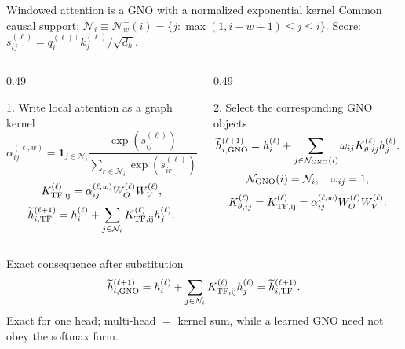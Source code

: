 \begin{frame}[t,shrink=5]{Windowed attention is a GNO with a normalized exponential kernel}
Common causal support: $\mathcal N_i\equiv\mathcal N_w^{-}(i)=\{j:\max(1,i-w+1)\le j\le i\}$. Score: $s_{ij}^{(\ell)}=q_i^{(\ell)\top}k_j^{(\ell)}/\sqrt{d_k}$.\begin{columns}[T,onlytextwidth]
\begin{column}{0.49\textwidth}
\begin{block}{1. Write local attention as a graph kernel}
\[\alpha_{ij}^{(\ell,w)}=\mathbf1_{j\in\mathcal N_i}\frac{\exp(s_{ij}^{(\ell)})}{\sum_{r\in\mathcal N_i}\exp(s_{ir}^{(\ell)})}.\]
\[K_{\rm TF,ij}^{(\ell)}=\alpha_{ij}^{(\ell,w)}W_O^{(\ell)}W_V^{(\ell)},\]
\[\widetilde h_{i,\rm TF}^{(\ell+1)}=h_i^{(\ell)}+\sum_{j\in\mathcal N_i}K_{\rm TF,ij}^{(\ell)}h_j^{(\ell)}.\]
\end{block}

\end{column}
\begin{column}{0.49\textwidth}
\begin{block}{2. Select the corresponding GNO objects}
\[\widetilde h_{i,\rm GNO}^{(\ell+1)}=h_i^{(\ell)}+\sum_{j\in\mathcal N_{\rm GNO}(i)}\omega_{ij}K_{\theta,ij}^{(\ell)}h_j^{(\ell)}.\]
\[\mathcal N_{\rm GNO}(i)=\mathcal N_i,\quad\omega_{ij}=1,\]
\[K_{\theta,ij}^{(\ell)}=K_{\rm TF,ij}^{(\ell)}=\alpha_{ij}^{(\ell,w)}W_O^{(\ell)}W_V^{(\ell)}.\]
\end{block}

\end{column}
\end{columns}
\begin{alertblock}{Exact consequence after substitution}
\[\widetilde h_{i,\rm GNO}^{(\ell+1)}=h_i^{(\ell)}+\sum_{j\in\mathcal N_i}K_{\rm TF,ij}^{(\ell)}h_j^{(\ell)}=\widetilde h_{i,\rm TF}^{(\ell+1)}.\]Exact for one head; multi-head \ensuremath{=} kernel sum, while a learned GNO need not obey the softmax form.
\end{alertblock}


\end{frame}

